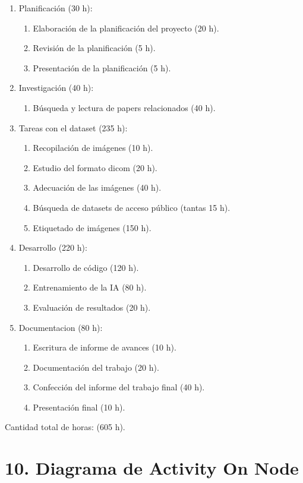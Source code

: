 \documentclass[
11pt, %
]{charter}
\begin{document}
\begin{enumerate}
	\item Planificación (30 h):
		\begin{enumerate}
		\item Elaboración de la planificación del proyecto (20 h).
		\item Revisión de la planificación (5 h).
		\item Presentación de la planificación (5 h).
		\end{enumerate}
	\item Investigación (40 h):
		\begin{enumerate}
		\item Búsqueda y lectura de papers relacionados (40 h).
		\end{enumerate}
	\item Tareas con el dataset (235 h):
		\begin{enumerate}
		\item Recopilación de imágenes (10 h).
		\item Estudio del formato dicom (20 h).
		\item Adecuación de las imágenes (40 h).
		\item Búsqueda de datasets de acceso público (tantas 15 h).
		\item Etiquetado de imágenes (150 h).
		\end{enumerate}
	\item Desarrollo (220 h):
		\begin{enumerate}
		\item Desarrollo de código (120 h).
		\item Entrenamiento de la IA (80 h).
		\item Evaluación de resultados (20 h).
		\end{enumerate}
	\item Documentacion (80 h):
		\begin{enumerate}
		\item Escritura de informe de avances (10 h).
		\item Documentación del trabajo (20 h).
		\item Confección del informe del trabajo final (40 h).
		\item Presentación final (10 h).
		\end{enumerate}
	\end{enumerate}

Cantidad total de horas: (605 h).

\section{10. Diagrama de Activity On Node}
\label{sec:AoN}
\end{document}
